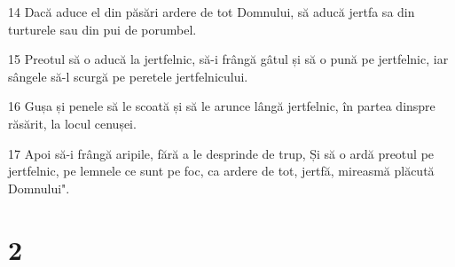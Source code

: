 \par 14 Dacă aduce el din păsări ardere de tot Domnului, să aducă jertfa sa din turturele sau din pui de porumbel.
\par 15 Preotul să o aducă la jertfelnic, să-i frângă gâtul și să o pună pe jertfelnic, iar sângele să-l scurgă pe peretele jertfelnicului.
\par 16 Gușa și penele să le scoată și să le arunce lângă jertfelnic, în partea dinspre răsărit, la locul cenușei.
\par 17 Apoi să-i frângă aripile, fără a le desprinde de trup, Și să o ardă preotul pe jertfelnic, pe lemnele ce sunt pe foc, ca ardere de tot, jertfă, mireasmă plăcută Domnului".

\chapter{2}

